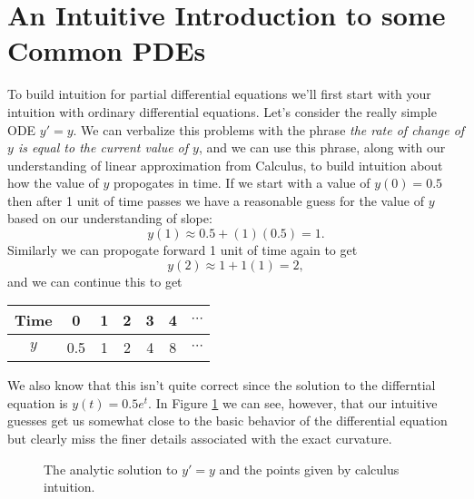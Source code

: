 \newpage\section{An Intuitive Introduction to some Common PDEs}
To build intuition for partial differential equations we'll first start with your
intuition with ordinary differential equations.  Let's consider the really simple ODE $y'
= y$.  We can verbalize this problems with the phrase {\it the rate of change of $y$ is
equal to the current value of $y$}, and we can use this phrase, along with our
understanding of linear approximation from Calculus, to build intuition about
how the value of $y$ propogates in time.  
If we start with a value of $y(0) = 0.5$ then after 1 unit of time passes we have a reasonable
guess for the value of $y$ based on our understanding of slope:
\[ y(1) \approx 0.5 + (1)(0.5) = 1. \]
Similarly we can propogate forward 1 unit of time again to get 
\[ y(2) \approx 1 + 1(1) = 2, \]
and we can continue this to get 
\begin{center}
    \begin{tabular}{|c||c|c|c|c|c|c|}
        \hline
        Time & 0 & 1 & 2 & 3 & 4 & $\cdots$ \\\hline
        $y$ & 0.5 & 1 & 2 & 4 & 8 & $\cdots$ \\ \hline
    \end{tabular}
\end{center}
We also know that this isn't quite correct since the solution to the differntial equation
is $y(t) = 0.5 e^t$.  In Figure \ref{fig:intuition_odes} we can see, however, that our intuitive guesses get
us somewhat close to the basic behavior of the differential equation but clearly miss the
finer details associated with the exact curvature. 
\begin{figure}[ht!]
    \begin{center}
    \end{center}
    \caption{The analytic solution to $y'=y$ and the points given by calculus intuition.}
    \label{fig:intuition_odes}
\end{figure}

